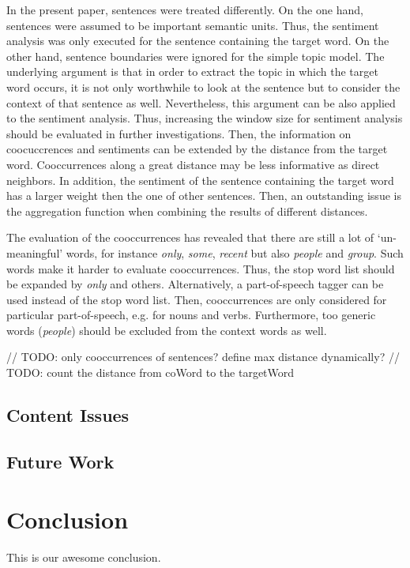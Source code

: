 \documentclass[10pt,a4paper,twocolumn]{scrartcl}
\begin{document}
In the present paper, sentences were treated differently. On the one hand, sentences were assumed to be important semantic units. Thus, the sentiment analysis was only executed for the sentence containing the target word. On the other hand, sentence boundaries were ignored for the simple topic model. The underlying argument is that in order to extract the topic in which the target word occurs, it is not only worthwhile to look at the sentence but to consider the context of that sentence as well. Nevertheless, this argument can be also applied to the sentiment analysis. Thus, increasing the window size for sentiment analysis should be evaluated in further investigations. Then, the information on coocuccrences and sentiments can be extended by the distance from the target word. Cooccurrences along a great distance may be less informative as direct neighbors. In addition, the sentiment of the sentence containing the target word has a larger weight then the one of other sentences. Then, an outstanding issue is the aggregation function when combining the results of different distances.

The evaluation of the cooccurrences has revealed that there are still a lot of `un-meaningful' words, for instance \textit{only}, \textit{some}, \textit{recent} but also \textit{people} and \textit{group}. Such words make it harder to evaluate cooccurrences. Thus, the stop word list should be expanded by \textit{only} and others. Alternatively, a part-of-speech tagger can be used instead of the stop word list. Then, cooccurrences are only considered for particular part-of-speech, e.g. for nouns and verbs. Furthermore, too generic words (\textit{people}) should be excluded from the context words as well. 


 
// TODO: only cooccurrences of sentences? define max distance dynamically?
// TODO: count the distance from coWord to the targetWord

\subsection{Content Issues}




\subsection{Future Work}

\section{Conclusion}
This is our awesome conclusion.
\end{document}
